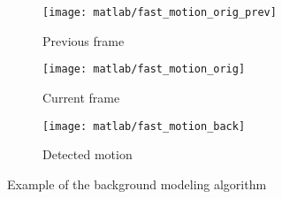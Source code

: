 \documentclass[a4paper,oneside]{article}
\begin{document}
\begin{figure}[htbp]
  \centering
  \begin{subfigure}{0.3\textwidth}
    \centering
    \texttt{[image: matlab/fast\_motion\_orig\_prev]}
    \caption{Previous frame}
    \label{fig:back_orig_prev}
  \end{subfigure}%
  \begin{subfigure}{0.3\textwidth}
    \centering
    \texttt{[image: matlab/fast\_motion\_orig]}
    \caption{Current frame}
    \label{fig:back_orig}
  \end{subfigure}%
  \begin{subfigure}{0.3\textwidth}
    \centering
    \texttt{[image: matlab/fast\_motion\_back]}
    \caption{Detected motion}
    \label{fig:back}
  \end{subfigure}%
  \caption{Example of the background modeling algorithm}
\end{figure}
\end{document}
